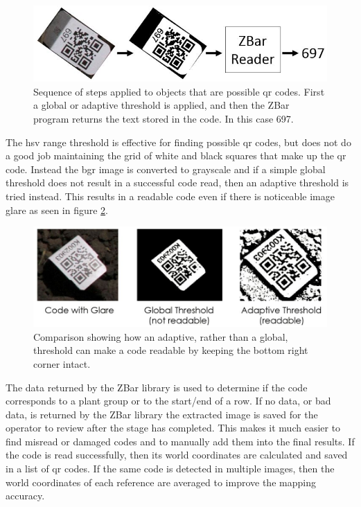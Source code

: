 \begin{figure}
	\centering
    \includegraphics[width=6in]{figures/code_extraction_step2.jpg}
    \caption[Extracted code threshold]{Sequence of steps applied to objects that are possible \ac{qr} codes.  First a global or adaptive threshold is applied, and then the ZBar program returns the text stored in the code. In this case 697.}
    \label{figure:code_extraction2}
\end{figure} 

The \ac{hsv} range threshold is effective for finding possible \ac{qr} codes, but does not do a good job maintaining the grid of white and black squares that make up the \ac{qr} code.  Instead the \ac{bgr} image is converted to grayscale and if a simple global threshold does not result in a successful code read, then an adaptive threshold is tried instead.  This results in a readable code even if there is noticeable image glare as seen in figure \ref{figure:adaptive_threshold}. 

\begin{figure}
	\centering
    \includegraphics[width=5.5in]{figures/adaptive_threshold.jpg}
    \caption[Adaptive threshold]{Comparison showing how an adaptive, rather than a global, threshold can make a code readable by keeping the bottom right corner intact.}
    \label{figure:adaptive_threshold}
\end{figure} 

The data returned by the ZBar library is used to determine if the code corresponds to a plant group or to the start/end of a row.  If no data, or bad data, is returned by the ZBar library the extracted image is saved for the operator to review after the stage has completed.  This makes it much easier to find misread or damaged codes and to manually add them into the final results.  If the code is read successfully, then its world coordinates are calculated and saved in a list of \ac{qr} codes.   If the same code is detected in multiple images, then the world coordinates of each reference are averaged to improve the mapping accuracy.

